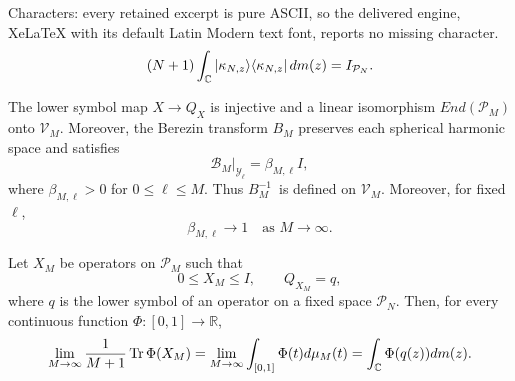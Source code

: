 \documentclass[10pt,a4paper]{amsart}
\newcommand{\func}[1]{\operatorname{#1}}
\begin{document}
Characters: every retained excerpt is pure ASCII, so the delivered engine, XeLaTeX with its default Latin Modern text font, reports no missing character.
\begin{equation}
(N+1)\int_{\mathbb{C}}|\kappa _{N,z}\rangle \langle \kappa _{N,z}|\,dm(z)=I_{%
\mathcal{P}_{N}}\text{.}  \label{eq:resolution}
\end{equation}%

\begin{lemma}
\label{lem:berezincalculus} The lower symbol map $X\rightarrow Q_{X}$ is
injective and a linear isomorphism $End(\mathcal{P}_{M})$ onto $\mathcal{V}%
_{M}$. Moreover, the Berezin transform $B_{M}$ preserves each spherical
harmonic space and satisfies 
\begin{equation}
\mathcal{B}_{M}|_{\mathcal{Y}_{\ell }}=\beta _{M,\ell }I,
\label{eq:berezineigenvalue}
\end{equation}%
where $\beta _{M,\ell }>0$ for $0\leq \ell \leq M$. Thus $B_{M}^{-1}$\ is
defined on $\mathcal{V}_{M}$. Moreover, for fixed $\ell $, 
\begin{equation}
\beta _{M,\ell }\longrightarrow 1\quad \text{as }M\longrightarrow \infty .
\label{eq:betalimit}
\end{equation}
\end{lemma}

\begin{lemma}
\label{lem:classical} Let $X_{M}$ be operators on $\mathcal{P}_{M}$ such
that 
\begin{equation*}
0\leq X_{M}\leq I,\qquad Q_{X_{M}}=q,
\end{equation*}%
where $q$ is the lower symbol of an operator on a fixed space $\mathcal{P}%
_{N}$. Then, for every continuous function $\Phi :[0,1]\rightarrow \mathbb{R}
$, 
\begin{equation}
\lim_{M\rightarrow \infty }\frac{1}{M+1}\func{Tr}\Phi
(X_{M})=\lim_{M\rightarrow \infty }\int_{[0,1]}\Phi (t)d\mu _{M}(t)=\int_{%
\mathbb{C}}\Phi (q(z))dm(z).  \label{eq:classicalconv}
\end{equation}
\end{lemma}
\end{document}
